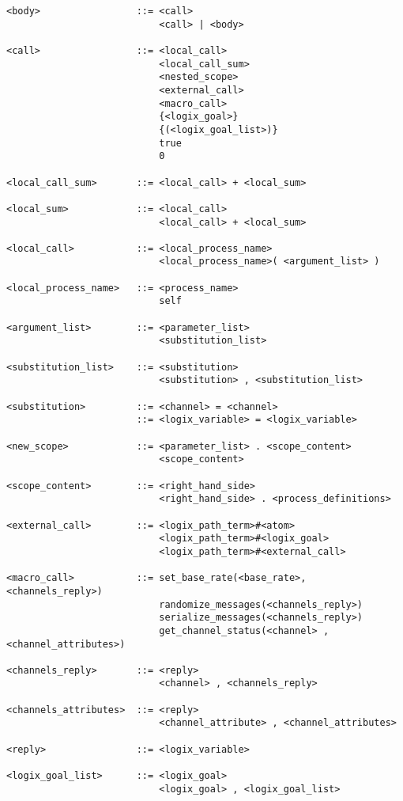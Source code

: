 \begin{verbatim}
<body>                 ::= <call>
                           <call> | <body>

<call>                 ::= <local_call>
                           <local_call_sum>
                           <nested_scope>
                           <external_call>
                           <macro_call>
                           {<logix_goal>}
                           {(<logix_goal_list>)}
                           true
                           0

<local_call_sum>       ::= <local_call> + <local_sum>

<local_sum>            ::= <local_call>
                           <local_call> + <local_sum>

<local_call>           ::= <local_process_name>
                           <local_process_name>( <argument_list> )

<local_process_name>   ::= <process_name>
                           self

<argument_list>        ::= <parameter_list>
                           <substitution_list>

<substitution_list>    ::= <substitution>
                           <substitution> , <substitution_list>

<substitution>         ::= <channel> = <channel>
                       ::= <logix_variable> = <logix_variable>

<new_scope>            ::= <parameter_list> . <scope_content>
                           <scope_content>

<scope_content>        ::= <right_hand_side>
                           <right_hand_side> . <process_definitions>

<external_call>        ::= <logix_path_term>#<atom>
                           <logix_path_term>#<logix_goal>
                           <logix_path_term>#<external_call>

<macro_call>           ::= set_base_rate(<base_rate>, <channels_reply>)
                           randomize_messages(<channels_reply>)
                           serialize_messages(<channels_reply>)
                           get_channel_status(<channel> , <channel_attributes>)

<channels_reply>       ::= <reply>
                           <channel> , <channels_reply>

<channels_attributes>  ::= <reply>
                           <channel_attribute> , <channel_attributes>

<reply>                ::= <logix_variable>

<logix_goal_list>      ::= <logix_goal>
                           <logix_goal> , <logix_goal_list>
\end{verbatim}

